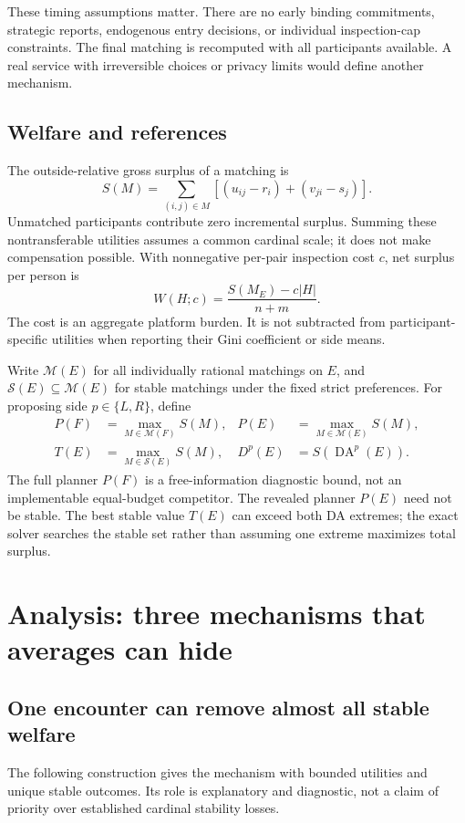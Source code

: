 \documentclass[11pt,a4paper]{article}
\newcommand{\DA}{\operatorname{DA}}
\begin{document}
These timing assumptions matter. There are no early binding commitments, strategic reports, endogenous entry decisions, or individual inspection-cap constraints. The final matching is recomputed with all participants available. A real service with irreversible choices or privacy limits would define another mechanism.

\subsection{Welfare and references}
The outside-relative gross surplus of a matching is
\begin{equation}\label{eq:surplus}
S(M)=\sum_{(i,j)\in M}\left[(u_{ij}-r_i)+(v_{ji}-s_j)\right].
\end{equation}
Unmatched participants contribute zero incremental surplus. Summing these nontransferable utilities assumes a common cardinal scale; it does not make compensation possible. With nonnegative per-pair inspection cost $c$, net surplus per person is
\begin{equation}\label{eq:net}
W(H;c)=\frac{S(M_E)-c|H|}{n+m}.
\end{equation}
The cost is an aggregate platform burden. It is not subtracted from participant-specific utilities when reporting their Gini coefficient or side means.

Write $\mathcal M(E)$ for all individually rational matchings on $E$, and $\mathcal S(E)\subseteq\mathcal M(E)$ for stable matchings under the fixed strict preferences. For proposing side $p\in\{L,R\}$, define
\begin{align}
P(F)&=\max_{M\in\mathcal M(F)}S(M),&
P(E)&=\max_{M\in\mathcal M(E)}S(M),\\
T(E)&=\max_{M\in\mathcal S(E)}S(M),&
D^p(E)&=S(\DA^p(E)).
\end{align}
The full planner $P(F)$ is a free-information diagnostic bound, not an implementable equal-budget competitor. The revealed planner $P(E)$ need not be stable. The best stable value $T(E)$ can exceed both DA extremes; the exact solver searches the stable set rather than assuming one extreme maximizes total surplus.

\section{Analysis: three mechanisms that averages can hide}\label{sec:analysis}
\subsection{One encounter can remove almost all stable welfare}
The following construction gives the mechanism with bounded utilities and unique stable outcomes. Its role is explanatory and diagnostic, not a claim of priority over established cardinal stability losses.
\end{document}
